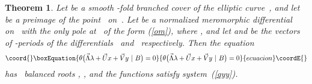 \documentclass[a4paper,11pt]{article}
\providecommand{\cE}{{\cal E}}
\providecommand{\vL}{\Vec{\Lambda}}
\providecommand{\vU}{\Vec{U}}
\providecommand{\vV}{\Vec{V}}
\theoremstyle{plain}
\newtheorem{teo}{Theorem}
\theoremstyle{remark}
\begin{document}
\begin{teo}
Let \myHighlight{$\Gamma$}\coordHE{} be a smooth \coordHE{}-fold branched cover of the elliptic
curve~\myHighlight{$\cE$}\coordHE{}, and let \coordHE{} be a preimage of the point~\coordHE{}
on~\myHighlight{$\cE$}\coordHE{}. Let \coordHE{} be a normalized meromorphic differential
on~\myHighlight{$\Gamma$}\coordHE{} with the only pole at~\coordHE{} of the form \emph{(\ref{om})},
where \coordHE{}, and let \myHighlight{$2\pi i \vU$}\coordHE{} and \myHighlight{$2\pi i \vV$}\coordHE{} be the
vectors of \coordHE{}-periods of the differentials~\coordHE{}
and~\coordHE{} respectively. Then the equation
\begin{equation}\coord{}\boxEquation{
\theta \bigl( \vL\lambda+\vU x+\vV y\ |\ B \bigr)=0
}{
\theta \bigl( \vL\lambda+\vU x+\vV y\ |\ B \bigr)=0
}{ecuacion}\coordE{}\end{equation}
has~\coordHE{} balanced roots \coordHE{}, \coordHE{},
and the functions \coordHE{} satisfy system~\emph{(\ref{qyy})}.
\end{teo}
\end{document}
